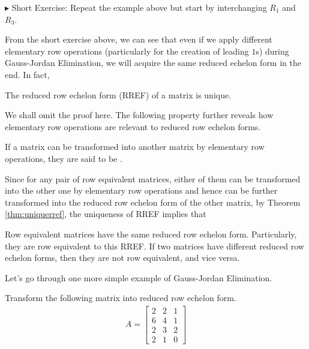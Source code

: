 $\blacktriangleright$ Short Exercise: Repeat the example above but start by interchanging $R_1$ and $R_3$.\footnotemark\par
From the short exercise above, we can see that even if we apply different elementary row operations (particularly for the creation of leading $1$s) during Gauss-Jordan Elimination, we will acquire the same reduced echelon form in the end. In fact,
\begin{thm}
\label{thm:uniquerref}
The reduced row echelon form (RREF) of a matrix is unique.
\end{thm}
We shall omit the proof here. The following property further reveals how elementary row operations are relevant to reduced row echelon forms.
\begin{proper}
\label{proper:rowequiv}
If a matrix can be transformed into another matrix by elementary row operations, they are said to be .
\end{proper}
Since for any pair of row equivalent matrices, either of them can be transformed into the other one by elementary row operations and hence can be further transformed into the reduced row echelon form of the other matrix, by Theorem \ref{thm:uniquerref}, the uniqueness of RREF implies that
\begin{proper}
\label{proper:rowequivreduce}
Row equivalent matrices have the same reduced row echelon form. Particularly, they are row equivalent to this RREF. If two matrices have different reduced row echelon forms, then they are not row equivalent, and vice versa.
\end{proper}
Let's go through one more simple example of Gauss-Jordan Elimination.
\begin{exmp}
\label{exmp:rref2}
Transform the following matrix into reduced row echelon form.
\begin{align*}
A =
\begin{bmatrix}
2 & 2 & 1 \\
6 & 4 & 1 \\
2 & 3 & 2 \\
2 & 1 & 0
\end{bmatrix}    
\end{align*}
\end{exmp}
